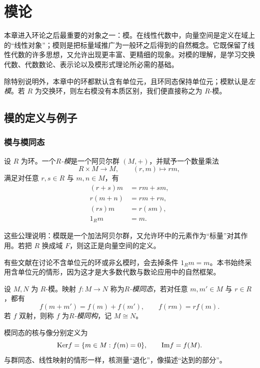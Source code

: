 \chapter{模论}

本章进入环论之后最重要的对象之一：模。在线性代数中，向量空间是定义在域上的“线性对象”；模则是把标量域推广为一般环之后得到的自然概念。它既保留了线性代数的许多思想，又允许出现更丰富、更精细的现象。对模的理解，是学习交换代数、代数数论、表示论以及模形式理论所必需的基础。

除特别说明外，本章中的环都默认含有单位元，且环同态保持单位元；模默认是\emph{左模}。若 $R$ 为交换环，则左右模没有本质区别，我们便直接称之为 $R$-模。

\section{模的定义与例子}

\subsection{模与模同态}

\begin{definition}
设 $R$ 为环。一个\emph{$R$-模}是一个阿贝尔群 $(M,+)$，并赋予一个数量乘法
\[
R\times M\longrightarrow M,\qquad (r,m)\longmapsto rm,
\]
满足对任意 $r,s\in R$ 与 $m,n\in M$，有
\begin{align*}
(r+s)m&=rm+sm,\\
r(m+n)&=rm+rn,\\
(rs)m&=r(sm),\\
1_Rm&=m.
\end{align*}
\end{definition}

这些公理说明：模既是一个加法阿贝尔群，又允许环中的元素作为“标量”对其作用。若把 $R$ 换成域 $F$，则这正是向量空间的定义。

\begin{remark}
有些文献在讨论不含单位元的环或非幺模时，会去掉条件 $1_Rm=m$。本书始终采用含单位元的情形，因为这才是大多数代数与数论应用中的自然框架。
\end{remark}

\begin{definition}
设 $M,N$ 为 $R$-模。映射 $f\colon M\to N$ 称为\emph{$R$-模同态}，若对任意 $m,m'\in M$ 与 $r\in R$，都有
\[
f(m+m')=f(m)+f(m'),\qquad f(rm)=rf(m).
\]
若 $f$ 双射，则称 $f$ 为\emph{$R$-模同构}，记 $M\cong N$。
\end{definition}

模同态的核与像分别定义为
\[
\mathrm{Ker} f=\{m\in M:f(m)=0\},\qquad \mathrm{Im} f=f(M).
\]
与群同态、线性映射的情形一样，核测量“退化”，像描述“达到的部分”。

